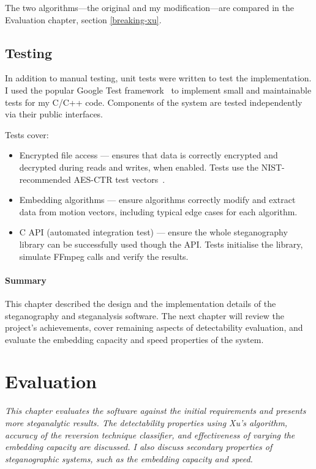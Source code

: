 \documentclass[12pt,british,twoside,notitlepage,usenames,dvipsnames,hypens,final]{report}
\numberwithin{equation}{section}
\numberwithin{figure}{section}
\begin{document}
The two algorithms---the original and my modification---are compared in the Evaluation chapter, section \ref{breaking-xu}.

\section{Testing}

In addition to manual testing, unit tests were written to test the implementation. I used the popular Google Test framework~\cite{googletest} to implement small and maintainable tests for my C/C++ code. Components of the system are tested independently via their public interfaces.

Tests cover:
\begin{itemize}
\item Encrypted file access --- ensures that data is correctly encrypted and decrypted during reads and writes, when enabled. Tests use the NIST-recommended AES-CTR test vectors~\cite[Appendix F, Sect. 5.5]{dworkin2001nist}.
\item Embedding algorithms --- ensure algorithms correctly modify and extract data from motion vectors, including typical edge cases for each algorithm.
\item C API (automated integration test) --- ensure the whole steganography library can be successfully used though the API. Tests initialise the library, simulate FFmpeg calls and verify the results.
\end{itemize}

\bigskip
\subsubsection*{Summary}
This chapter described the design and the implementation details of the steganography and steganalysis software. The next chapter will review the project's achievements, cover remaining aspects of detectability evaluation, and evaluate the embedding capacity and speed properties of the system.

\cleardoublepage
\chapter{Evaluation}

\textit{This chapter evaluates the software against the initial requirements and presents more steganalytic results. The detectability properties using Xu's algorithm, accuracy of the reversion technique classifier, and effectiveness of varying the embedding capacity are discussed. I also discuss secondary properties of steganographic systems, such as the embedding capacity and speed.
}
\end{document}
